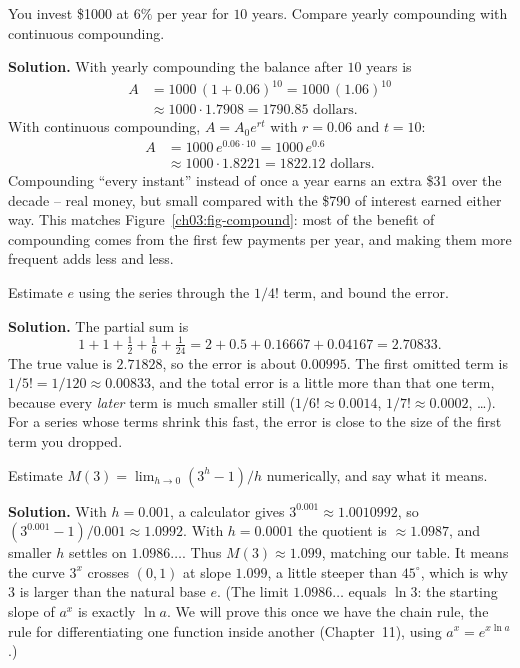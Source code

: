 \begin{example}\label{ch03:ex-money}
You invest \$1000 at $6\%$ per year for $10$ years. Compare yearly compounding with continuous compounding.

\textbf{Solution.} With yearly compounding the balance after $10$ years is
\begin{align*}
A &= 1000\,(1+0.06)^{10} = 1000\,(1.06)^{10}\\
  &\approx 1000 \cdot 1.7908 = 1790.85 \text{ dollars}.
\end{align*}
With continuous compounding, $A = A_0 e^{rt}$ with $r=0.06$ and $t=10$:
\begin{align*}
A &= 1000\,e^{0.06\cdot 10} = 1000\,e^{0.6}\\
  &\approx 1000 \cdot 1.8221 = 1822.12 \text{ dollars}.
\end{align*}
Compounding ``every instant'' instead of once a year earns an extra \$31 over the decade -- real money, but small compared with the \$790 of interest earned either way. This matches Figure~\ref{ch03:fig-compound}: most of the benefit of compounding comes from the first few payments per year, and making them more frequent adds less and less.
\end{example}

\begin{example}\label{ch03:ex-series}
Estimate $e$ using the series through the $1/4!$ term, and bound the error.

\textbf{Solution.} The partial sum is
\[
1 + 1 + \tfrac12 + \tfrac16 + \tfrac{1}{24} = 2 + 0.5 + 0.16667 + 0.04167 = 2.70833.
\]
The true value is $2.71828$, so the error is about $0.00995$. The first omitted term is $1/5! = 1/120 \approx 0.00833$, and the total error is a little more than that one term, because every \emph{later} term is much smaller still ($1/6!\approx0.0014$, $1/7!\approx0.0002$, \ldots). For a series whose terms shrink this fast, the error is close to the size of the first term you dropped.
\end{example}

\begin{example}\label{ch03:ex-slope}
Estimate $M(3)=\lim_{h\to0}(3^h-1)/h$ numerically, and say what it means.

\textbf{Solution.} With $h=0.001$, a calculator gives $3^{0.001}\approx 1.0010992$, so $(3^{0.001}-1)/0.001 \approx 1.0992$. With $h=0.0001$ the quotient is $\approx 1.0987$, and smaller $h$ settles on $1.0986\ldots$. Thus $M(3)\approx 1.099$, matching our table. It means the curve $3^x$ crosses $(0,1)$ at slope $1.099$, a little steeper than $45^\circ$, which is why $3$ is larger than the natural base $e$. (The limit $1.0986\ldots$ equals $\ln 3$: the starting slope of $a^x$ is exactly $\ln a$. We will prove this once we have the chain rule, the rule for differentiating one function inside another (Chapter~11), using $a^x = e^{x\ln a}$.)
\end{example}

